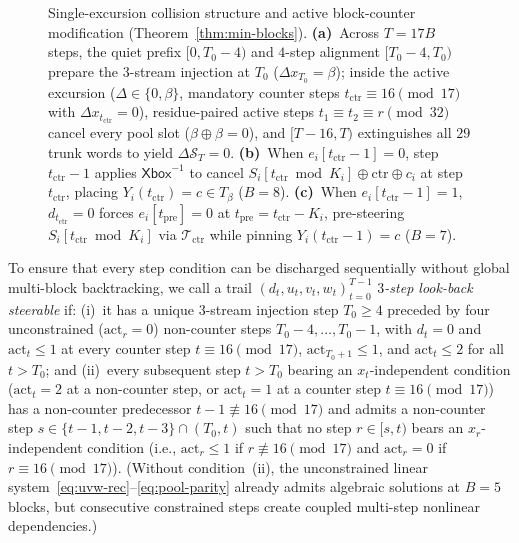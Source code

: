 \documentclass[11pt,a4paper]{article}
\theoremstyle{definition}
\theoremstyle{remark}
\newcommand{\Xbox}{\mathsf{Xbox}}
\begin{document}
\begin{figure}[t!]
\begin{tikzpicture}
\end{tikzpicture}
\caption{Single-excursion collision structure and active block-counter modification (Theorem~\ref{thm:min-blocks}). \textbf{(a)}~Across $T = 17B$ steps, the quiet prefix $[0, T_0 - 4)$ and $4$-step alignment $[T_0 - 4, T_0)$ prepare the $3$-stream injection at $T_0$ ($\Delta x_{T_0} = \beta$); inside the active excursion ($\Delta \in \{0, \beta\}$, mandatory counter steps $t_{\mathrm{ctr}} \equiv 16 \pmod{17}$ with $\Delta x_{t_{\mathrm{ctr}}} = 0$), residue-paired active steps $t_1 \equiv t_2 \equiv r \pmod{32}$ cancel every pool slot ($\beta \oplus \beta = 0$), and $[T - 16, T)$ extinguishes all $29$ trunk words to yield $\Delta \mathcal{S}_T = 0$. \textbf{(b)}~When $e_i[t_{\mathrm{ctr}}-1] = 0$, step $t_{\mathrm{ctr}} - 1$ applies $\Xbox^{-1}$ to cancel $S_i[t_{\mathrm{ctr}} \bmod K_i] \oplus \mathrm{ctr} \oplus c_i$ at step $t_{\mathrm{ctr}}$, placing $Y_i(t_{\mathrm{ctr}}) = c \in T_\beta$ ($B = 8$). \textbf{(c)}~When $e_i[t_{\mathrm{ctr}}-1] = 1$, $d_{t_{\mathrm{ctr}}} = 0$ forces $e_i[t_{\mathrm{pre}}] = 0$ at $t_{\mathrm{pre}} = t_{\mathrm{ctr}} - K_i$, pre-steering $S_i[t_{\mathrm{ctr}} \bmod K_i]$ via $\mathcal{T}_{\mathrm{ctr}}$ while pinning $Y_i(t_{\mathrm{ctr}}-1) = c$ ($B = 7$).}
\label{fig:collision-steering}
\end{figure}

To ensure that every step condition can be discharged sequentially without global multi-block backtracking, we call a trail $(d_t, u_t, v_t, w_t)_{t=0}^{T-1}$ \emph{$3$-step look-back steerable} if: (i)~it has a unique $3$-stream injection step $T_0 \ge 4$ preceded by four unconstrained ($\mathrm{act}_r = 0$) non-counter steps $T_0 - 4, \dots, T_0 - 1$, with $d_t = 0$ and $\mathrm{act}_t \le 1$ at every counter step $t \equiv 16 \pmod{17}$, $\mathrm{act}_{T_0 + 1} \le 1$, and $\mathrm{act}_t \le 2$ for all $t > T_0$; and (ii)~every subsequent step $t > T_0$ bearing an $x_t$-independent condition ($\mathrm{act}_t = 2$ at a non-counter step, or $\mathrm{act}_t = 1$ at a counter step $t \equiv 16 \pmod{17}$) has a non-counter predecessor $t - 1 \not\equiv 16 \pmod{17}$ and admits a non-counter step $s \in \{t - 1, t - 2, t - 3\} \cap (T_0, t)$ such that no step $r \in [s, t)$ bears an $x_r$-independent condition (i.e., $\mathrm{act}_r \le 1$ if $r \not\equiv 16 \pmod{17}$ and $\mathrm{act}_r = 0$ if $r \equiv 16 \pmod{17}$). (Without condition~(ii), the unconstrained linear system~\eqref{eq:uvw-rec}--\eqref{eq:pool-parity} already admits algebraic solutions at $B = 5$ blocks, but consecutive constrained steps create coupled multi-step nonlinear dependencies.)
\end{document}
